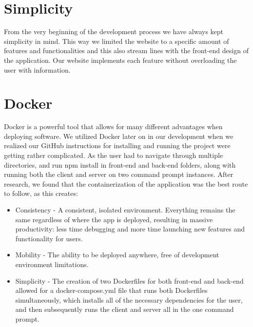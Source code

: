 \section{Simplicity}
From the very beginning of the development process we have always kept simplicity in mind. This way we limited the website to a specific amount of features and functionalities and this also stream lines with the front-end design of the application. Our website implements each feature without overloading the user with information.

\section{Docker}

Docker is a powerful tool that allows for many different advantages when deploying software. We utilized Docker later on in our development when we realized our GitHub instructions for installing and running the project were getting rather complicated. As the user had to navigate through multiple directories, and run npm install in front-end and back-end folders, along with running both the client and server on two command prompt instances. After research, we found that the containerization of the application was the best route to follow, as this creates:
\begin{itemize}
    \item Consistency - A consistent, isolated environment. Everything remains the same regardless of where the app is deployed, resulting in massive productivity: less time debugging and more time launching new features and functionality for users.
    \item Mobility - The ability to be deployed anywhere, free of development environment limitations. \item Simplicity - The creation of two Dockerfiles for both front-end and back-end allowed for a docker-compose.yml file that runs both Dockerfiles simultaneously, which installs all of the necessary dependencies for the user, and then subsequently runs the client and server all in the one command prompt.
\end{itemize}


